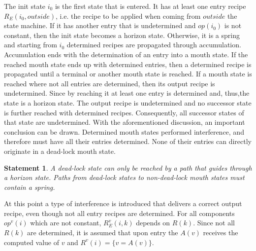 \documentclass[12pt,a4paper]{scrartcl}
\newtheorem{statement}{Statement}
\begin{document}
The init state $i_0$ is the first state that is entered. It has at least one entry recipe
$R_E(i_0,outside)$, i.e. the recipe to be applied when coming from $outside$ the
state machine. If it has another entry that is undetermined and $op(i_0)$ is not constant, then the init
state becomes a horizon state. Otherwise, it is
a spring and starting from $i_0$ determined recipes are propagated through accumulation.
Accumulation ends with the determination of an entry into a mouth state. If the
reached mouth state ends up with determined entries, then a determined recipe
is propagated until a terminal or another mouth state is reached. If a mouth
state is reached where not all entries are determined, then its output recipe
is undetermined. Since by reaching it at least one entry is determined and,
thus,the state is a horizon state. The output recipe is undetermined and no
successor state is further reached with determined recipes. Consequently, all
successor states of that state are undetermined.  With the aforementioned
discussion, an important conclusion can be drawn.  Determined mouth states 
performed interference, and therefore must have all their entries determined. 
None of their entries can directly originate in a dead-lock mouth state.

\begin{statement} \label{stm:dead-lock-horizon}
A dead-lock state can only be reached by a path that guides through a horizon
state.  Paths from dead-lock states to non-dead-lock mouth states must contain
a spring.  
\end{statement}

At this point a type of interference is introduced that delivers a correct
output recipe, even though not all entry recipes are determined. For all components
$op^v(i)$ which are not constant, $R^v_E(i,k)$ depends on $R(k)$. Since not all 
$R(k)$ are determined, it is assumed that upon entry the $A(v)$ receives the
computed value of $v$ and $R^v(i) = \{ v = A(v) \}$.
\end{document}
